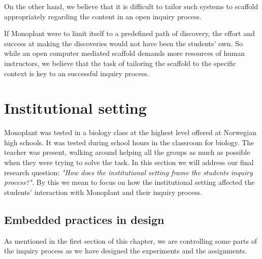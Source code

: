 On the other hand, we believe that it is difficult to tailor such systems to scaffold appropriately regarding the content in an open inquiry process.

 If Monoplant were to limit itself to a predefined path of discovery, the effort and success at making the discoveries would not have been the students' own. So while an open computer mediated scaffold demands more resources of human instructors, we believe that the task of tailoring the scaffold to the specific context is key to an successful inquiry process. 









\section{Institutional setting}
Monoplant was tested in a biology class at the highest level offered at Norwegian high schools. It was tested during school hours in the classroom for biology. The teacher was present, walking around helping all the groups as much as possible when they were trying to solve the task. In this section we will address our final research question: \emph{"How does the institutional setting frame the students inquiry process?"}.
By this we mean to focus on how the institutional setting affected the students' interaction with Monoplant and their inquiry process. 

\subsection{Embedded practices in design}
As mentioned in the first section of this chapter, we are controlling some parts of the inquiry process as we have designed the experiments and the assignments. 

